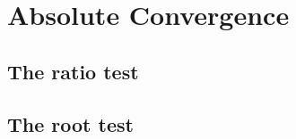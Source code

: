 
\graphicspath{{./chap3/images/}} 

\chapter{Absolute Convergence}
\section{The ratio test}
\section{The root test}